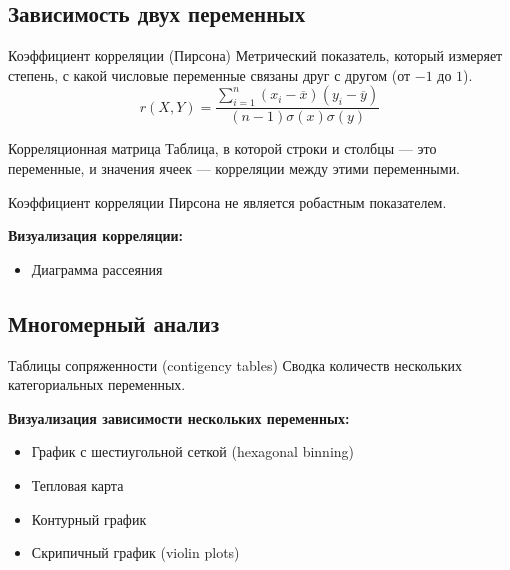 \subsection{Зависимость двух переменных}
\begin{terms}
    \item[Коэффициент корреляции (Пирсона)] Метрический показатель, который измеряет степень,
    с какой числовые переменные связаны друг с другом (от $-1$ до $1$).
    \begin{equation*}
        r(X, Y) = \frac{\sum_{i=1}^{n} (x_i - \overline{x}) (y_i - \overline{y})}{(n - 1) \sigma(x) \sigma(y)}
    \end{equation*}
    \item[Корреляционная матрица] Таблица, в которой строки и столбцы --- это переменные, и значения ячеек ---
    корреляции между этими переменными.
\end{terms}
Коэффициент корреляции Пирсона не является робастным показателем.
\par \textbf{Визуализация корреляции:}
\begin{itemize}
    \item Диаграмма рассеяния
\end{itemize}

\subsection{Многомерный анализ}
\begin{terms}
    \item[Таблицы сопряженности (contigency tables)] Сводка количеств нескольких категориальных переменных.
\end{terms}
\textbf{Визуализация зависимости нескольких переменных:}
\begin{itemize}
    \item График с шестиугольной сеткой (hexagonal binning)
    \item Тепловая карта
    \item Контурный график
    \item Скрипичный график (violin plots)
\end{itemize}
